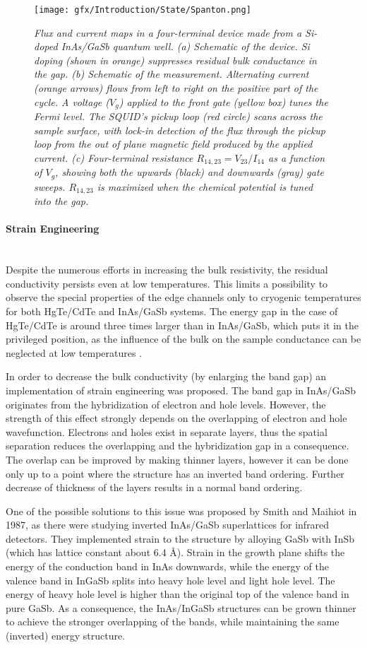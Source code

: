 \documentclass[titlepage,a4paper]{book}
\newcommand{\wciecie}{\quad\phantom{v}}
\newcommand{\myparagraph}[1]{\paragraph{#1}\mbox{}\\}
\begin{document}
\begin{figure}[ht]
	\centering
	\texttt{[image: gfx/Introduction/State/Spanton.png]}
	\vspace{-10pt}
	\caption{\textit{Flux and current maps in a four-terminal device made from a Si-doped InAs/GaSb quantum well. (a) Schematic of the device. Si doping (shown in orange) suppresses residual bulk conductance in the gap. (b) Schematic of the measurement. Alternating current (orange arrows) flows from left to right on the positive part of the cycle. A voltage ($V_g$) applied to the front gate (yellow box) tunes the Fermi level. The SQUID’s pickup loop (red circle) scans
across the sample surface, with lock-in detection of the flux through
the pickup loop from the out of plane magnetic field produced by the
applied current. (c) Four-terminal resistance $R_{14,23} = V_{23}/I_{14}$ as a
function of $V_g$, showing both the upwards (black) and downwards
(gray) gate sweeps. $R_{14,23}$ is maximized when the chemical
potential is tuned into the gap. \cite{Spanton_State}}}
	\label{fig:Spanton_State}
\end{figure} 

\myparagraph{Strain Engineering}
\wciecie
Despite the numerous efforts in increasing the bulk resistivity, the residual conductivity persists even at low temperatures. This limits a possibility to observe the special properties of the edge channels only to cryogenic temperatures for both HgTe/CdTe and InAs/GaSb systems. The energy gap in the case of HgTe/CdTe is around three times larger than in InAs/GaSb, which puts it in the privileged position, as the influence of the bulk on the sample conductance can be neglected at low temperatures \cite{Konig_Topology}. 

In order to decrease the bulk conductivity (by enlarging the band gap) an implementation of strain engineering was proposed. The band gap in InAs/GaSb originates from the hybridization of electron and hole levels. However, the strength of this effect strongly depends on the overlapping of electron and hole wavefunction. Electrons and holes exist in separate layers, thus the spatial separation reduces the overlapping and the hybridization gap in a consequence. The overlap can be improved by making thinner layers, however it can be done only up to a point where the structure has an inverted band ordering. Further decrease of thickness of the layers results in a normal band ordering.

One of the possible solutions to this issue was proposed \cite{Smith_State} by Smith and Maihiot in 1987, as there were studying inverted InAs/GaSb superlattices for infrared detectors. They implemented strain to the structure by alloying GaSb with InSb (which has lattice constant about 6.4 Å). Strain in the growth plane shifts the energy of the conduction band in InAs downwards, while the energy of the valence band in InGaSb splits into heavy hole level and light hole level. The energy of heavy hole level is higher than the original top of the valence band in pure GaSb. As a consequence, the InAs/InGaSb structures can be grown thinner to achieve the stronger overlapping of the bands, while maintaining the same (inverted) energy structure.
\end{document}
